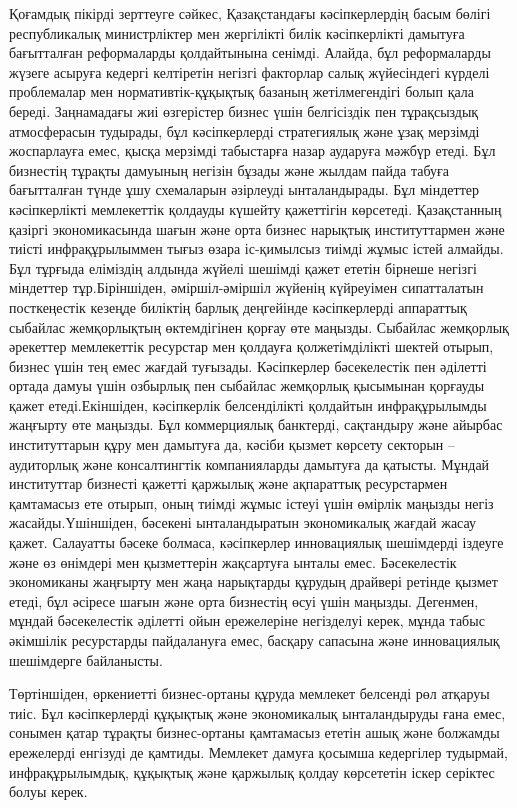 \begin{multicols}{2}
Қоғамдық пікірді зерттеуге сәйкес, Қазақстандағы кәсіпкерлердің басым
бөлігі республикалық министрліктер мен жергілікті билік кәсіпкерлікті
дамытуға бағытталған реформаларды қолдайтынына сенімді. Алайда, бұл
реформаларды жүзеге асыруға кедергі келтіретін негізгі факторлар салық
жүйесіндегі күрделі проблемалар мен нормативтік-құқықтық базаның
жетілмегендігі болып қала береді. Заңнамадағы жиі өзгерістер бизнес үшін
белгісіздік пен тұрақсыздық атмосферасын тудырады, бұл кәсіпкерлерді
стратегиялық және ұзақ мерзімді жоспарлауға емес, қысқа мерзімді
табыстарға назар аударуға мәжбүр етеді. Бұл бизнестің тұрақты дамуының
негізін бұзады және жылдам пайда табуға бағытталған түнде ұшу схемаларын
әзірлеуді ынталандырады. Бұл міндеттер кәсіпкерлікті мемлекеттік
қолдауды күшейту қажеттігін көрсетеді. Қазақстанның қазіргі
экономикасында шағын және орта бизнес нарықтық институттармен және
тиісті инфрақұрылыммен тығыз өзара іс-қимылсыз тиімді жұмыс істей
алмайды. Бұл тұрғыда еліміздің алдында жүйелі шешімді қажет ететін
бірнеше негізгі міндеттер тұр.Біріншіден, әміршіл-әміршіл жүйенің
күйреуімен сипатталатын посткеңестік кезеңде биліктің барлық деңгейінде
кәсіпкерлерді аппараттық сыбайлас жемқорлықтың өктемдігінен қорғау өте
маңызды. Сыбайлас жемқорлық әрекеттер мемлекеттік ресурстар мен қолдауға
қолжетімділікті шектей отырып, бизнес үшін тең емес жағдай туғызады.
Кәсіпкерлер бәсекелестік пен әділетті ортада дамуы үшін озбырлық пен
сыбайлас жемқорлық қысымынан қорғауды қажет етеді.Екіншіден, кәсіпкерлік
белсенділікті қолдайтын инфрақұрылымды жаңғырту өте маңызды. Бұл
коммерциялық банктерді, сақтандыру және айырбас институттарын құру мен
дамытуға да, кәсіби қызмет көрсету секторын -- аудиторлық және
консалтингтік компанияларды дамытуға да қатысты. Мұндай институттар
бизнесті қажетті қаржылық және ақпараттық ресурстармен қамтамасыз ете
отырып, оның тиімді жұмыс істеуі үшін өмірлік маңызды негіз
жасайды.Үшіншіден, бәсекені ынталандыратын экономикалық жағдай жасау
қажет. Салауатты бәсеке болмаса, кәсіпкерлер инновациялық шешімдерді
іздеуге және өз өнімдері мен қызметтерін жақсартуға ынталы емес.
Бәсекелестік экономиканы жаңғырту мен жаңа нарықтарды құрудың драйвері
ретінде қызмет етеді, бұл әсіресе шағын және орта бизнестің өсуі үшін
маңызды. Дегенмен, мұндай бәсекелестік әділетті ойын ережелеріне
негізделуі керек, мұнда табыс әкімшілік ресурстарды пайдалануға емес,
басқару сапасына және инновациялық шешімдерге байланысты.

Төртіншіден, өркениетті бизнес-ортаны құруда мемлекет белсенді рөл
атқаруы тиіс. Бұл кәсіпкерлерді құқықтық және экономикалық ынталандыруды
ғана емес, сонымен қатар тұрақты бизнес-ортаны қамтамасыз ететін ашық
және болжамды ережелерді енгізуді де қамтиды. Мемлекет дамуға қосымша
кедергілер тудырмай, инфрақұрылымдық, құқықтық және қаржылық қолдау
көрсететін іскер серіктес болуы керек.


\end{multicols}

